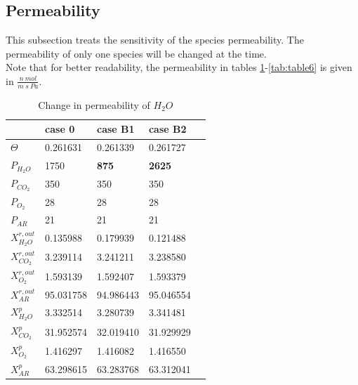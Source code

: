 \subsection{Permeability}
This subsection treats the sensitivity of the species permeability. The permeability of only one species will be changed at the time. \\
Note that for better readability, the permeability in tables \ref{tab:table3}-\ref{tab:table6} is given in  $\frac{n\ mol}{m \ s \ Pa}$. 

\begin{table}[H]
\centering
\caption{Change in permeability of $H_2O$}
\label{tab:table3}
\begin{tabular}{|l|l|l|l|l|}
\hline
                    & case 0        & case B1       & case B2        \\ \hline
$\Theta$            & 0.261631      & 0.261339      & 0.261727       \\ \hline
$P_{H_2O}$          & 1750          & \textbf{875}  & \textbf{2625}  \\ \hline
$P_{CO_2}$          & 350           & 350           & 350            \\ \hline
$P_{O_2}$           & 28            & 28            & 28             \\ \hline
$P_{AR}$            & 21            & 21            & 21             \\ \hline \hline
$X^{r,out}_{H_2O}$  & 0.135988      & 0.179939      & 0.121488       \\ \hline
$X^{r,out}_{CO_2}$  & 3.239114      & 3.241211      & 3.238580       \\ \hline
$X^{r,out}_{O_2}$   & 1.593139      & 1.592407      & 1.593379       \\ \hline
$X^{r,out}_{AR}$    & 95.031758     & 94.986443     & 95.046554      \\ \hline
$X^{p}_{H_2O}$      & 3.332514      & 3.280739      & 3.341481       \\ \hline
$X^{p}_{CO_2}$      & 31.952574     & 32.019410     & 31.929929      \\ \hline
$X^{p}_{O_2}$       & 1.416297      & 1.416082      & 1.416550       \\ \hline
$X^{p}_{AR}$        & 63.298615     & 63.283768     & 63.312041      \\ \hline
\end{tabular}
\end{table}

